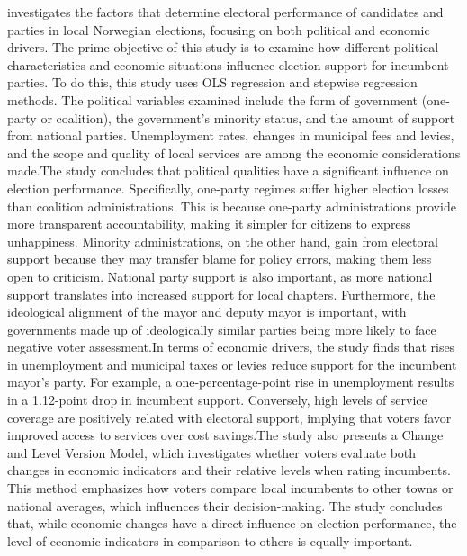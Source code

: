  investigates the factors that determine electoral performance of candidates and parties in local Norwegian elections, focusing on both political and economic drivers. The prime objective of this study is to examine how different political characteristics and economic situations influence election support for incumbent parties. To do this, this study uses OLS regression and stepwise regression methods. The political variables examined include the form of government (one-party or coalition), the government's minority status, and the amount of support from national parties. Unemployment rates, changes in municipal fees and levies, and the scope and quality of local services are among the economic considerations made.The study concludes that political qualities have a significant influence on election performance. Specifically, one-party regimes suffer higher election losses than coalition administrations. This is because one-party administrations provide more transparent accountability, making it simpler for citizens to express unhappiness. Minority administrations, on the other hand, gain from electoral support because they may transfer blame for policy errors, making them less open to criticism. National party support is also important, as more national support translates into increased support for local chapters. Furthermore, the ideological alignment of the mayor and deputy mayor is important, with governments made up of ideologically similar parties being more likely to face negative voter assessment.In terms of economic drivers, the study finds that rises in unemployment and municipal taxes or levies reduce support for the incumbent mayor's party. For example, a one-percentage-point rise in unemployment results in a 1.12-point drop in incumbent support. Conversely, high levels of service coverage are positively related with electoral support, implying that voters favor improved access to services over cost savings.The study also presents a Change and Level Version Model, which investigates whether voters evaluate both changes in economic indicators and their relative levels when rating incumbents. This method emphasizes how voters compare local incumbents to other towns or national averages, which influences their decision-making. The study concludes that, while economic changes have a direct influence on election performance, the level of economic indicators in comparison to others is equally important.\\
